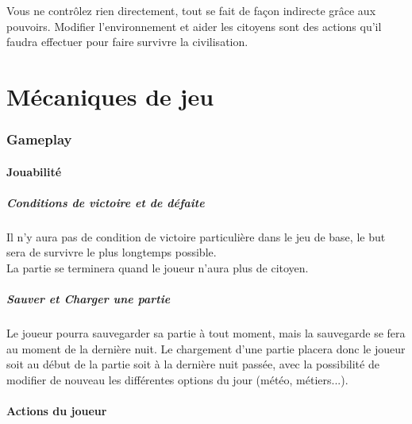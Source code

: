 \documentclass[a4paper]{article}
\begin{document}
			Vous ne contrôlez rien directement, tout se fait de façon indirecte grâce aux pouvoirs. Modifier l'environnement et aider les citoyens sont des actions qu'il faudra effectuer pour faire survivre la civilisation.


  \newpage
  \part{Mécaniques de jeu}
    \section{Gameplay}
      \subsection{Jouabilité}
		\subsubsection{Conditions de victoire et de défaite}
			Il n'y aura pas de condition de victoire particulière dans le jeu de base, le but sera de survivre le plus longtemps possible.\\
			La partie se terminera quand le joueur n'aura plus de citoyen.
		\subsubsection{Sauver et Charger une partie}
			Le joueur pourra sauvegarder sa partie à tout moment, mais la sauvegarde se fera au moment de la dernière nuit.
			Le chargement d'une partie placera donc le joueur soit au début de la partie soit à la dernière nuit passée, avec la possibilité de modifier de nouveau les différentes options du jour (météo, métiers...).


	\subsection{Actions du joueur}
\end{document}
